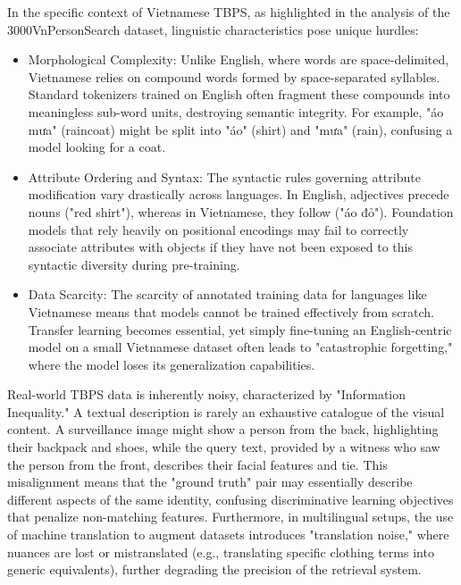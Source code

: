 \documentclass[../main.tex]{subfiles}
\begin{document}
In the specific context of Vietnamese TBPS, as highlighted in the analysis of the 3000VnPersonSearch dataset, linguistic characteristics pose unique hurdles:
\begin{itemize}
    \item Morphological Complexity: Unlike English, where words are space-delimited, Vietnamese relies on compound words formed by space-separated syllables. Standard tokenizers trained on English often fragment these compounds into meaningless sub-word units, destroying semantic integrity. For example, "áo mưa" (raincoat) might be split into "áo" (shirt) and "mưa" (rain), confusing a model looking for a coat. 

    \item Attribute Ordering and Syntax: The syntactic rules governing attribute modification vary drastically across languages. In English, adjectives precede nouns ("red shirt"), whereas in Vietnamese, they follow ("áo đỏ"). Foundation models that rely heavily on positional encodings may fail to correctly associate attributes with objects if they have not been exposed to this syntactic diversity during pre-training. 

    \item Data Scarcity: The scarcity of annotated training data for languages like Vietnamese means that models cannot be trained effectively from scratch. Transfer learning becomes essential, yet simply fine-tuning an English-centric model on a small Vietnamese dataset often leads to "catastrophic forgetting," where the model loses its generalization capabilities.
\end{itemize}


Real-world TBPS data is inherently noisy, characterized by "Information Inequality." A textual description is rarely an exhaustive catalogue of the visual content. A surveillance image might show a person from the back, highlighting their backpack and shoes, while the query text, provided by a witness who saw the person from the front, describes their facial features and tie. This misalignment means that the "ground truth" pair may essentially describe different aspects of the same identity, confusing discriminative learning objectives that penalize non-matching features. Furthermore, in multilingual setups, the use of machine translation to augment datasets introduces "translation noise," where nuances are lost or mistranslated (e.g., translating specific clothing terms into generic equivalents), further degrading the precision of the retrieval system.
\end{document}
